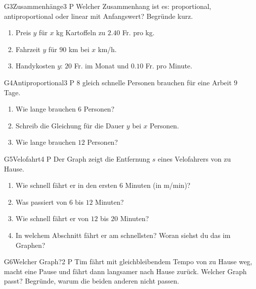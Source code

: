 \documentclass[11pt]{article}
\begin{document}
\begin{lpaufgabe}{G3}{Zusammenhänge}{3 P}
Welcher Zusammenhang ist es: proportional, antiproportional oder linear mit Anfangswert? Begründe kurz.
\begin{enumerate}[label=(\alph*),leftmargin=*,itemsep=3pt]
\item Preis $y$ für $x$ kg Kartoffeln zu $2.40$ Fr. pro kg.
\item Fahrzeit $y$ für $90$ km bei $x$ km/h.
\item Handykosten $y$: $20$ Fr. im Monat und $0.10$ Fr. pro Minute.
\end{enumerate}
\end{lpaufgabe}

\begin{lpaufgabe}{G4}{Antiproportional}{3 P}
$8$ gleich schnelle Personen brauchen für eine Arbeit $9$ Tage.
\begin{enumerate}[label=(\alph*),leftmargin=*,itemsep=3pt]
\item Wie lange brauchen $6$ Personen?
\item Schreib die Gleichung für die Dauer $y$ bei $x$ Personen.
\item Wie lange brauchen $12$ Personen?
\end{enumerate}
\end{lpaufgabe}


\begin{lpaufgabe}{G5}{Velofahrt}{4 P}
Der Graph zeigt die Entfernung $s$ eines Velofahrers von zu Hause.
\begin{center}
\end{center}
\begin{enumerate}[label=(\alph*),leftmargin=*,itemsep=3pt]
\item Wie schnell fährt er in den ersten $6$ Minuten (in m/min)?
\item Was passiert von $6$ bis $12$ Minuten?
\item Wie schnell fährt er von $12$ bis $20$ Minuten?
\item In welchem Abschnitt fährt er am schnellsten? Woran siehst du das im Graphen?
\end{enumerate}
\end{lpaufgabe}

\begin{lpaufgabe}{G6}{Welcher Graph?}{2 P}
Tim fährt mit gleichbleibendem Tempo von zu Hause weg, macht eine Pause und fährt dann langsamer nach Hause zurück.
Welcher Graph passt? Begründe, warum die beiden anderen nicht passen.
\begin{center}
\hfill
{}\hfill
{}
\end{center}
\end{lpaufgabe}
\end{document}
